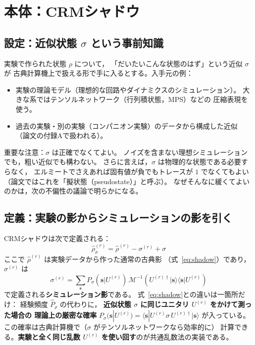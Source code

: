 \documentclass[11pt]{ltjsarticle}
\newcommand{\ket}[1]{|#1\rangle}
\newcommand{\bra}[1]{\langle#1|}
\newcommand{\ketbra}[2]{|#1\rangle\langle#2|}
\begin{document}
\section{本体：CRMシャドウ}

\subsection{設定：近似状態 $\sigma$ という事前知識}

実験で作られた状態 $\rho$ について，
「だいたいこんな状態のはず」という近似 $\sigma$ が
古典計算機上で扱える形で手に入るとする。入手元の例：
\begin{itemize}
  \item 実験の理論モデル（理想的な回路やダイナミクスのシミュレーション）。
        大きな系ではテンソルネットワーク（行列積状態，MPS）などの
        圧縮表現を使う。
  \item 過去の実験・別の実験（コンパニオン実験）のデータから構成した近似
        （論文の付録Aで扱われる）。
\end{itemize}
重要な注意：$\sigma$ は正確でなくてよい。
ノイズを含まない理想シミュレーションでも，粗い近似でも構わない。
さらに言えば，$\sigma$ は物理的な状態である必要すらなく，
エルミートでさえあれば固有値が負でもトレースが $1$ でなくてもよい
（論文ではこれを「擬状態（pseudostate）」と呼ぶ）。
なぜそんなに緩くてよいのかは，次の不偏性の議論で明らかになる。

\subsection{定義：実験の影からシミュレーションの影を引く}

CRMシャドウは次で定義される：
\begin{equation}
  \boxed{\;
  \hat{\rho}^{(r)}_\sigma = \hat{\rho}^{(r)} - \sigma^{(r)} + \sigma
  \;}
  \label{eq:crm-shadow}
\end{equation}
ここで $\hat{\rho}^{(r)}$ は実験データから作った通常の古典影
（式~\eqref{eq:shadow}）であり，$\sigma^{(r)}$ は
\begin{equation}
  \sigma^{(r)}
  = \sum_{\mathbf{s}} P_\sigma(\mathbf{s}|U^{(r)})\,
    \mathcal{M}^{-1}\!\left( U^{(r)\dagger} \ketbra{\mathbf{s}}{\mathbf{s}} U^{(r)} \right)
  \label{eq:sim-shadow}
\end{equation}
で定義される\textbf{シミュレーション影}である。
式~\eqref{eq:shadow}との違いは一箇所だけ：
経験頻度 $\hat P_\rho$ の代わりに，
\textbf{近似状態 $\sigma$ に同じユニタリ $U^{(r)}$ をかけて測った場合の
理論上の厳密な確率} $P_\sigma(\mathbf{s}|U^{(r)}) = \bra{\mathbf{s}} U^{(r)} \sigma\, U^{(r)\dagger} \ket{\mathbf{s}}$
が入っている。この確率は古典計算機で（$\sigma$ がテンソルネットワークなら効率的に）
計算できる。\textbf{実験と全く同じ乱数 $U^{(r)}$ を使い回す}のが共通乱数法の実装である。
\end{document}
